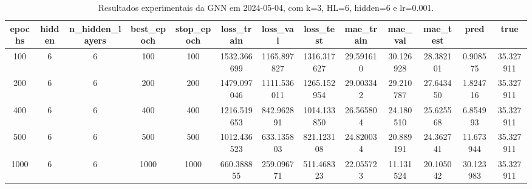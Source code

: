 \begin{table}[h]
\centering
\caption{Resultados experimentais da GNN em 2024-05-04, com k=3, HL=6, hidden=6 e lr=0.001.}
\label{tab:gnn_results_k3_hl6_h6_d20240504}
\begin{tabular}{ccccccccccccc}
\toprule
epochs & hidden & n\_hidden\_layers & best\_epoch & stop\_epoch & loss\_train & loss\_val & loss\_test & mae\_train & mae\_val & mae\_test & pred & true \\
\midrule
100 & 6 & 6 & 100 & 100 & 1532.366699 & 1165.897827 & 1316.317627 & 29.591610 & 30.126928 & 28.382101 & 0.908575 & 35.327911 \\
200 & 6 & 6 & 200 & 200 & 1479.097046 & 1111.536011 & 1265.152954 & 29.003342 & 29.210787 & 27.643450 & 1.824716 & 35.327911 \\
400 & 6 & 6 & 400 & 400 & 1216.519653 & 842.962891 & 1014.133850 & 26.565804 & 24.180510 & 25.625568 & 6.854993 & 35.327911 \\
500 & 6 & 6 & 500 & 500 & 1012.436523 & 633.135803 & 821.123108 & 24.820034 & 20.889191 & 24.362741 & 11.673944 & 35.327911 \\
1000 & 6 & 6 & 1000 & 1000 & 660.388855 & 259.096771 & 511.468323 & 22.055723 & 11.131524 & 20.105042 & 30.123983 & 35.327911 \\
\bottomrule
\end{tabular}
\end{table}
